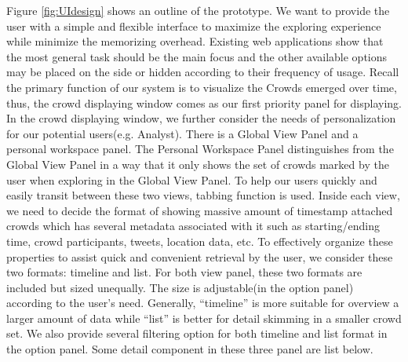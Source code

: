 \documentclass{sig-alternate}
\begin{document}
Figure \ref{fig:UIdesign} shows an outline of the prototype. We want to provide
the user with a simple and flexible interface to maximize the exploring
experience while minimize the memorizing overhead. Existing web applications
show that the most general task should be the main focus and the other
available options may be placed on the side or hidden according to their
frequency of usage. Recall the primary function of our system is to visualize
the Crowds emerged over time, thus, the crowd displaying window comes as our
first priority panel for displaying. In the crowd displaying window, we further
consider the needs of personalization for our potential users(e.g. Analyst).
There is a Global View Panel and a personal workspace panel. The Personal
Workspace Panel distinguishes from the Global View Panel in a way that it only
shows the set of crowds marked by the user when exploring in the Global View
Panel. To help our users quickly and easily transit between these two views,
tabbing function is used. Inside each view, we need to decide the format of
showing massive amount of timestamp attached crowds which has several metadata
associated with it such as starting/ending time, crowd participants, tweets,
location data, etc. To effectively organize these properties to assist quick
and convenient retrieval by the user, we consider these two formats: timeline
and list. For both view panel, these two formats are included but sized
unequally. The size is adjustable(in the option panel) according to the user's
need. Generally, ``timeline'' is more suitable for overview a larger amount of
data while ``list'' is better for detail skimming in a smaller crowd set. We
also provide several filtering option for both timeline and list format in the
option panel. Some detail component in these three panel are list below.
\end{document}

